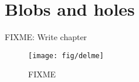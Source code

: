 \section{Blobs and holes}
%
FIXME: Write chapter
%
\begin{figure}[h!]
    \begin{center}
        \texttt{[image: fig/delme]}
    \end{center}
    \caption{
        FIXME
    }
    \label{fig:FIXME}
\end{figure}
%
